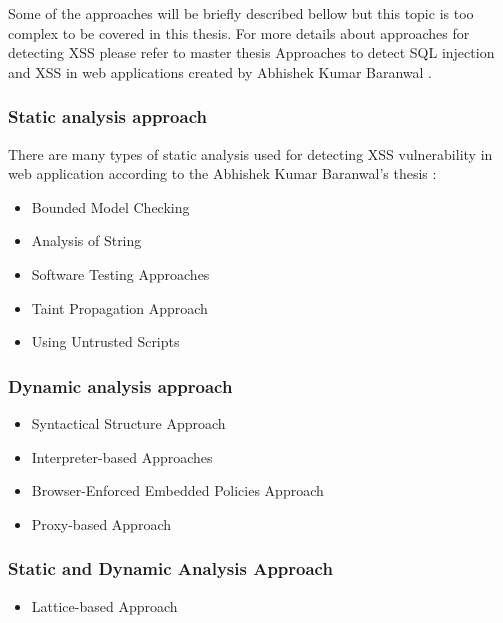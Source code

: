 			Some of the approaches will be briefly described bellow but this topic is too complex to be covered in this thesis. For more details about approaches for detecting XSS please refer to master thesis Approaches to detect SQL injection and XSS in web applications created by Abhishek Kumar Baranwal \cite{thesisApproaches}.
		
			\subsubsection{Static analysis approach}\label{approach-xss-static}
			
			There are many types of static analysis used for detecting XSS vulnerability in web application according to the Abhishek Kumar Baranwal's thesis \cite{thesisApproaches}:
			
			\begin{itemize}
				\item Bounded Model Checking
				\item Analysis of String
				\item Software Testing Approaches
				\item Taint Propagation Approach
				\item Using Untrusted Scripts
			\end{itemize}
			
			\subsubsection{Dynamic analysis approach}\label{approach-xss-dynamic}
			
			\begin{itemize}
				\item Syntactical Structure Approach
				\item Interpreter-based Approaches
				\item Browser-Enforced Embedded Policies Approach
				\item Proxy-based Approach
			\end{itemize}	
			
			\subsubsection{Static and Dynamic Analysis Approach}\label{approach-xss-static-and-dynamic}	
			
			\begin{itemize}
				\item Lattice-based Approach
			\end{itemize}
		
